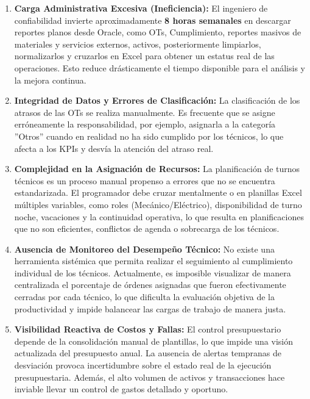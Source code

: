 \documentclass[11pt, letterpaper]{article}
\begin{document}
\begin{enumerate}
    \item \textbf{Carga Administrativa Excesiva (Ineficiencia):} 
    El ingeniero de confiabilidad invierte aproximadamente \textbf{8 horas semanales} en descargar reportes planos desde Oracle, como OTs, Cumplimiento, reportes masivos de materiales y servicios externos, activos, posteriormente limpiarlos, normalizarlos y cruzarlos en Excel para obtener un estatus real de las operaciones. Esto reduce drásticamente el tiempo disponible para el análisis y la mejora continua.

    \item \textbf{Integridad de Datos y Errores de Clasificación:} 
    La clasificación de los atrasos de las OTs se realiza manualmente. Es frecuente que se asigne erróneamente la responsabilidad, por ejemplo, asignarla a la categoría ''Otros'' cuando en realidad no ha sido cumplido por los técnicos, lo que afecta a los KPIs y desvía la atención del atraso real.

    \item \textbf{Complejidad en la Asignación de Recursos:} 
    La planificación de turnos técnicos es un proceso manual propenso a errores que no se encuentra estandarizada. El programador debe cruzar mentalmente o en planillas Excel múltiples variables, como roles (Mecánico/Eléctrico), disponibilidad de turno noche, vacaciones y la continuidad operativa, lo que resulta en planificaciones que no son eficientes, conflictos de agenda o sobrecarga de los técnicos.

    \item \textbf{Ausencia de Monitoreo del Desempeño Técnico:} 
    No existe una herramienta sistémica que permita realizar el seguimiento al cumplimiento individual de los técnicos. Actualmente, es imposible visualizar de manera centralizada el porcentaje de órdenes asignadas que fueron efectivamente cerradas por cada técnico, lo que dificulta la evaluación objetiva de la productividad y impide balancear las cargas de trabajo de manera justa.

    \item \textbf{Visibilidad Reactiva de Costos y Fallas:} 
    El control presupuestario depende de la consolidación manual de plantillas, lo que impide una visión actualizada del presupuesto anual. La ausencia de alertas tempranas de desviación provoca incertidumbre sobre el estado real de la ejecución presupuestaria. Además, el alto volumen de activos y transacciones hace inviable llevar un control de gastos detallado y oportuno.
\end{enumerate}
\end{document}
